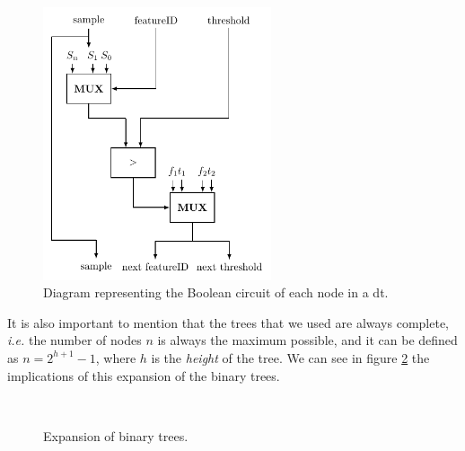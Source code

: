 \begin{figure}[!ht]
  \centering
  \includegraphics[width=0.60\textwidth]{images/decision_tree_node.pdf}
  \caption{Diagram representing the Boolean circuit of each node in a \ac{dt}.}
  \label{fig:DTNode}
\end{figure}


It is also important to mention that the trees that we used are always complete, \textit{i.e.} the number of nodes $n$ is always the maximum possible, and it can be defined as $n=2^{h+1}-1$, where $h$ is the \textit{height} of the tree. We can see in figure \ref{fig:ExpansionBinaryTrees} the implications of this expansion of the binary trees.

\begin{figure}[H]
	\centering
	\mbox{
	}
	\label{fig:ExpansionBinaryTrees}
	\caption{Expansion of binary trees.}
\end{figure}


